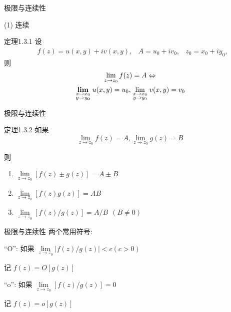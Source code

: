 \documentclass{beamer}
\begin{document}
\begin{frame}{极限与连续性}

(1) 连续


\begin{block}{定理1.3.1}
设
\begin{align*}
&f(z) = u(x, y) + iv(x, y), 
&A= u_0+ iv_0, 
&z_0= x_0+ iy_0, 
\end{align*}
则
\begin{gather*}
\lim\limits_{{{z}} \to {{{z}}_{{0}}}} f(z) = A \Leftrightarrow \\
\mathop {{\bf{lim}}}\limits_{\scriptstyle{{x}} \to {{{x}}_{{0}}}\atop	\scriptstyle{{y}} \to {{{y}}_{\bf{0}}}} {{u}} ( {{x}}, {{y}} ) = {{{u}}_0},  \lim\limits_{\scriptstyle{{x}} \to {{{x}}_{{0}}}\atop 	\scriptstyle{{y}} \to {{{y}}_{{0}}}} {{v}} ( {{x}}, {{y}} ) = {{{v}}_0}
\end{gather*}
\end{block}
\end{frame}

\begin{frame}{极限与连续性}
\begin{block}{定理1.3.2}
如果
\[  \lim\limits_{{z} \to {z}_{0}} {f} ( {z} ) = {A} , \lim\limits_{{z} \to {z}_{0}} {g} ( {z} ) = {{B}} \]

则
\begin{enumerate}[1)]
	\item $ \lim\limits_{{z} \to {z}_{0}} [{f} ( {z} ) \pm {g} ( {z})] = {A} \pm {B} $ 
	\item $ \lim\limits_{{z} \to {z}_{0}} [{f} ( {z} ) {g} ( {z})] = {{AB}} $ 
	\item $ \lim\limits_{{z} \to {z}_{0}} [{f} ( {z} ) /{g} ( {z})] = {{A/B}}~~( {{B}} \ne 0 )$ 
\end{enumerate}

\end{block}
\end{frame}

\begin{frame}{极限与连续性}
两个常用符号: 
\bigskip

``O'': 如果 $ \lim \limits_{z \to {z_0}} |f(z)/g(z)| < c(c > 0) $ 

记   $ f(z) = O [g(z)] $ 

\bigskip

``o'': 如果 $ \lim \limits_{z \to {z_0}} [f(z)/g(z)] = 0 $ 

记   $ f(z) = o [g(z)] $ 

\end{frame}
\end{document}
